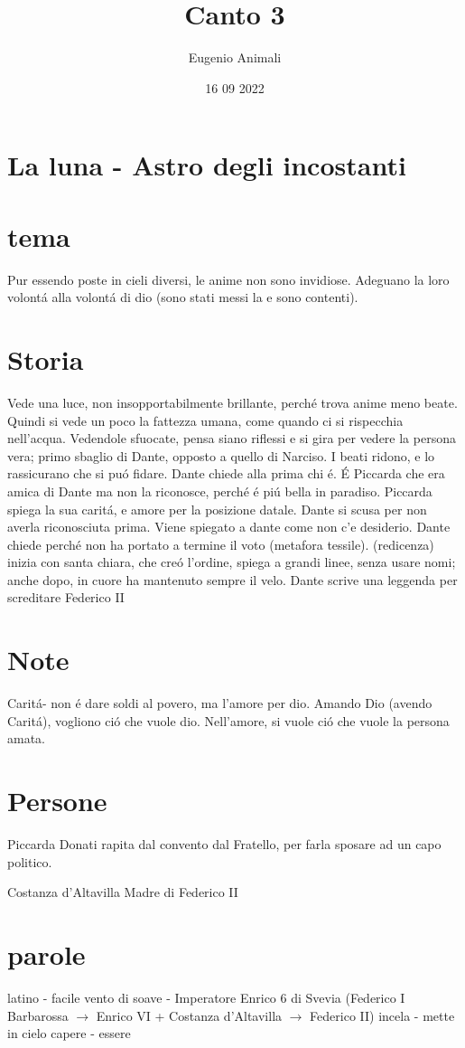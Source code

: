 \documentclass{article}
\title{Canto 3}
\author{Eugenio Animali}
\date{16 09 2022}
\begin{document}
\maketitle

\section*{La luna - Astro degli incostanti}
\section{tema}
Pur essendo poste in cieli diversi, le anime non sono invidiose. Adeguano la loro volontá alla volontá di dio (sono stati messi la e sono contenti).
\section*{Storia}
Vede una luce, non insopportabilmente brillante, perché trova anime meno beate. Quindi si vede un poco la fattezza umana, come quando ci si rispecchia nell'acqua. Vedendole sfuocate, pensa siano riflessi e si gira per vedere la persona vera; primo sbaglio di Dante, opposto a quello di Narciso. I beati ridono, e lo rassicurano che si puó fidare. Dante chiede alla prima chi é. É Piccarda che era amica di Dante ma non la riconosce, perché é piú bella in paradiso. Piccarda spiega la sua caritá, e amore per la posizione datale. Dante si scusa per non averla riconosciuta prima. Viene spiegato a dante come non c'e desiderio. Dante chiede perché non ha portato a termine il voto (metafora tessile). (redicenza) inizia con santa chiara, che creó l'ordine, spiega a grandi linee, senza usare nomi; anche dopo, in cuore ha mantenuto sempre il velo. Dante scrive una leggenda per screditare Federico II
\section{Note}
Caritá- non é dare soldi al povero, ma l'amore per dio. Amando Dio (avendo Caritá), vogliono ció che vuole dio. Nell'amore, si vuole ció che vuole la persona amata.
\section*{Persone}
Piccarda Donati rapita dal convento dal Fratello, per farla sposare ad un capo politico.

Costanza d'Altavilla Madre di Federico II
\section{parole}
latino - facile
vento di soave - Imperatore Enrico 6 di Svevia (Federico I Barbarossa $\to$ Enrico VI + Costanza d'Altavilla $\to$ Federico II)
incela - mette in cielo
capere - essere
\end{document}
